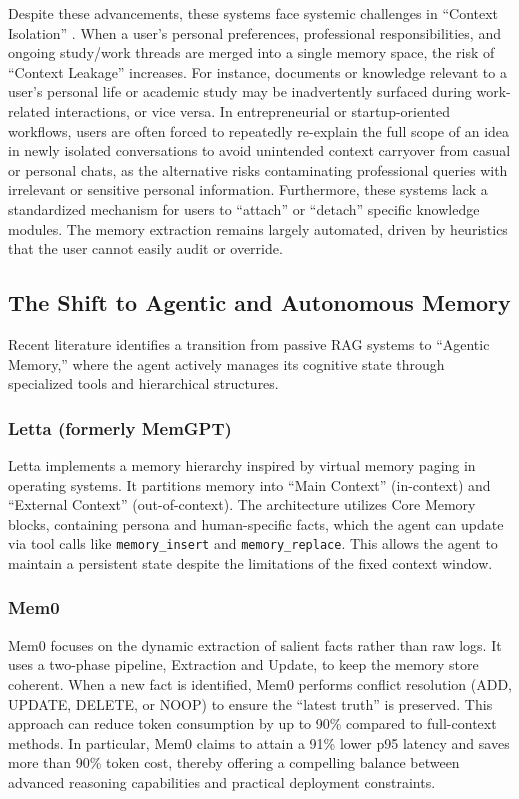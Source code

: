 \documentclass[12pt,a4paper]{article}
\begin{document}
Despite these advancements, these systems face systemic challenges in ``Context Isolation'' \cite{wu2024secgpt}. When a user's personal preferences, professional responsibilities, and ongoing study/work threads are merged into a single memory space, the risk of ``Context Leakage'' increases. For instance, documents or knowledge relevant to a user's personal life or academic study may be inadvertently surfaced during work-related interactions, or vice versa. In entrepreneurial or startup-oriented workflows, users are often forced to repeatedly re-explain the full scope of an idea in newly isolated conversations to avoid unintended context carryover from casual or personal chats, as the alternative risks contaminating professional queries with irrelevant or sensitive personal information. Furthermore, these systems lack a standardized mechanism for users to ``attach'' or ``detach'' specific knowledge modules. The memory extraction remains largely automated, driven by heuristics that the user cannot easily audit or override.

\subsection{The Shift to Agentic and Autonomous Memory}

Recent literature identifies a transition from passive RAG systems to ``Agentic Memory,'' where the agent actively manages its cognitive state through specialized tools and hierarchical structures.

\subsubsection{Letta (formerly MemGPT)}

Letta \cite{packer2023memgpt} implements a memory hierarchy inspired by virtual memory paging in operating systems. It partitions memory into ``Main Context'' (in-context) and ``External Context'' (out-of-context). The architecture utilizes Core Memory blocks, containing persona and human-specific facts, which the agent can update via tool calls like \texttt{memory\_insert} and \texttt{memory\_replace}. This allows the agent to maintain a persistent state despite the limitations of the fixed context window.

\subsubsection{Mem0}

Mem0 \cite{chhikara2025mem0} focuses on the dynamic extraction of salient facts rather than raw logs. It uses a two-phase pipeline, Extraction and Update, to keep the memory store coherent. When a new fact is identified, Mem0 performs conflict resolution (ADD, UPDATE, DELETE, or NOOP) to ensure the ``latest truth'' is preserved. This approach can reduce token consumption by up to 90\% compared to full-context methods. In particular, Mem0 claims to attain a 91\% lower p95 latency and saves more than 90\% token cost, thereby offering a compelling balance between advanced reasoning capabilities and practical deployment constraints.
\end{document}
